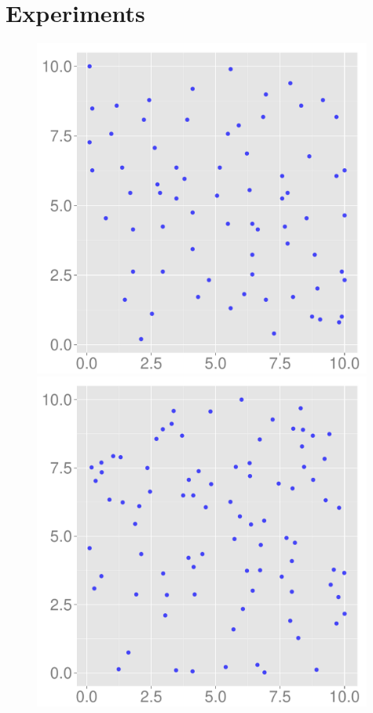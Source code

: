\documentclass{statsoc}
\begin{document}
\section{Experiments}
  \begin{figure}
  \begin{minipage}[h]{0.32\linewidth}
  \centering
    \includegraphics[width=0.99\textwidth]{figs/swedish.pdf} 
  \end{minipage}
  \begin{minipage}[h]{0.32\linewidth}
  \centering
  \includegraphics[width=0.99\textwidth]{figs/mild1.pdf}

\end{minipage}
\end{figure}
\end{document}
